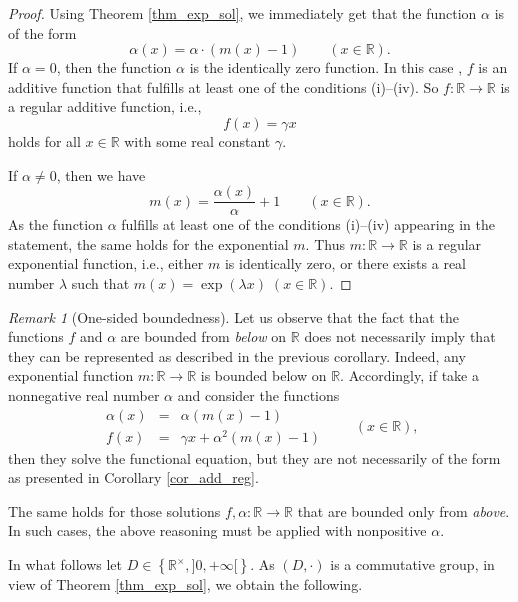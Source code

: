 \documentclass[a4paper,12pt]{article}
\theoremstyle{plain}
\theoremstyle{definition}
\theoremstyle{remark}
\newtheorem*{rem}{Remark}
\begin{document}
\begin{proof}
Using Theorem \ref{thm_exp_sol}, we immediately get that the function $\alpha$ is of the form 
\[
 \alpha(x)= \alpha\cdot  (m(x)-1)  
 \qquad 
 \left(x\in \mathbb{R}\right). 
\]
If $\alpha=0$, then the function $\alpha$ is the identically zero function. In this case , $f$ is an additive function that fulfills at least one of the conditions (i)--(iv). So $f\colon \mathbb{R}\to \mathbb{R}$ is a regular additive function, i.e., 
\[
 f(x)= \gamma x 
\]
holds for all $x\in \mathbb{R}$ with some real constant $\gamma$. 

If $\alpha \neq 0$, then we have 
\[
 m(x)= \frac{\alpha(x)}{\alpha}+1 
 \qquad 
 \left(x\in \mathbb{R}\right). 
\]
As the function $\alpha$ fulfills at least one of the conditions (i)--(iv) appearing in the statement, the same holds for the exponential $m$. Thus $m\colon \mathbb{R}\to \mathbb{R}$ is a regular exponential function, i.e., either $m$ is identically zero, or there exists a real number $\lambda$ such that $m(x)= \exp(\lambda x)\; (x\in \mathbb{R})$. 
\end{proof}


\begin{rem}[One-sided boundedness]
 Let us observe that the fact that the functions $f$ and $\alpha$ are bounded from \emph{below} on $\mathbb{R}$ does not necessarily imply that they can be represented as described in the previous corollary. Indeed, any exponential function $m\colon \mathbb{R}\to \mathbb{R}$ is bounded below on $\mathbb{R}$. Accordingly, if take a nonnegative real number $\alpha$ and consider the functions 
 \[
  \begin{array}{rcl}
 \alpha(x)&=& \alpha (m (x)-1)\\
  f(x)&=& \gamma   x+\alpha^{2} (m (x)- 1)
  \end{array}
  \qquad 
  \left(x\in \mathbb{R}\right), 
 \]
then they solve the functional equation, but they are not necessarily of the form as presented in Corollary \ref{cor_add_reg}. 

The same holds for those solutions $f, \alpha\colon \mathbb{R}\to \mathbb{R}$ that are bounded only from \emph{above}. In such cases, the above reasoning must be applied with nonpositive $\alpha$.
\end{rem}


In what follows let $D\in \left\{\mathbb{R}^{\times}, ]0, +\infty[ \right\}$. As $(D, \cdot)$ is a commutative group, in view of Theorem \ref{thm_exp_sol}, we obtain the following. 
\end{document}
